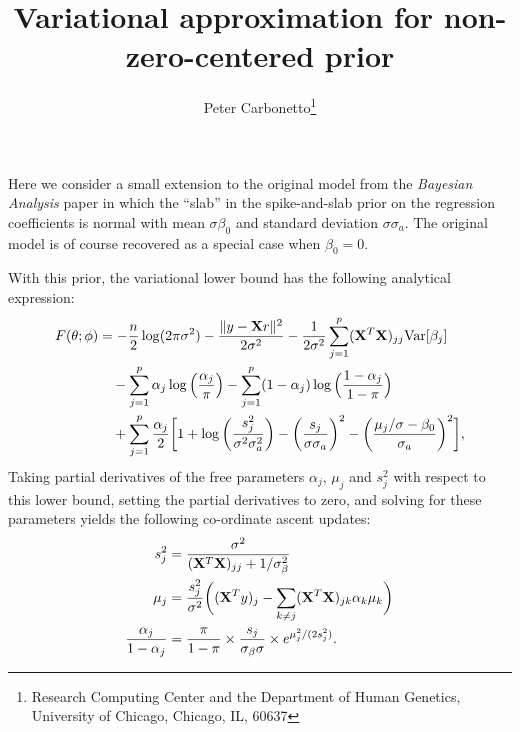 \documentclass[final]{siamltex}
\title{Variational approximation for non-zero-centered prior}
\author{Peter Carbonetto\thanks{Research Computing Center and the
    Department of Human Genetics, University of Chicago, Chicago, IL,
    60637}}
\begin{document}
\maketitle

\noindent Here we consider a small extension to the original model
from the {\em Bayesian Analysis} paper in which the ``slab'' in the
spike-and-slab prior on the regression coefficients is normal with
mean $\sigma \beta_0$ and standard deviation $\sigma \sigma_a$. The
original model is of course recovered as a special case when $\beta_0
= 0$.

With this prior, the variational lower bound has the following
analytical expression:
\begin{align}
F(\theta; \phi) &=
 - \frac{n}{2}\log(2\pi\sigma^2)
- \frac{\|y - {\bf X}r\|^2}{2\sigma^2} 
- \frac{1}{2\sigma^2} \sum_{j=1}^p ({\bf X}^T{\bf X})_{jj}
  \mathrm{Var}[\beta_j]
  \nonumber \\
&\quad - \sum_{j=1}^p \alpha_j \log\Big(\frac{\alpha_j}{\pi}\Big)
       - \sum_{j=1}^p (1-\alpha_j) \log\Big(\frac{1-\alpha_j}{1-\pi}\Big)
  \nonumber \\
&\quad + \sum_{j=1}^p \frac{\alpha_j}{2} \bigg[
1 + \log\bigg(\frac{s_j^2}{\sigma^2 \sigma_a^2}\bigg)
  - \bigg(\frac{s_j}{\sigma\sigma_a}\bigg)^2
  - \bigg(\frac{\mu_j/\sigma - \beta_0}{\sigma_a}\bigg)^2 \bigg],
\end{align}
Taking partial derivatives of the free parameters $\alpha_j$, $\mu_j$
and $s_j^2$ with respect to this lower bound, setting the partial
derivatives to zero, and solving for these parameters yields the
following co-ordinate ascent updates:
\begin{align}
s_j^2 &= \frac{\sigma^2}{({\bf X}^T{\bf X})_{jj} + 1/\sigma_{\beta}^2} \\
\mu_j &= \frac{s_j^2}{\sigma^2} \bigg( ({\bf X}^Ty)_j - \sum_{k \neq j} 
({\bf X}^T{\bf X})_{jk} \alpha_k \mu_k \bigg) \\
\frac{\alpha_j}{1-\alpha_j} &= \frac{\pi}{1-\pi} \times 
  \frac{s_j}{\sigma_{\beta}\sigma} \times e^{\mu_j^2/(2s_j^2)}.
\end{align}
\end{document}
